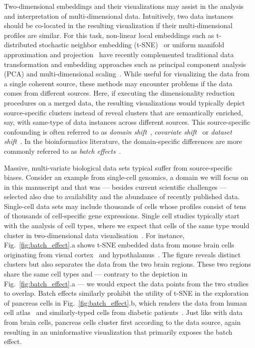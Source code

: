\documentclass[runningheads]{llncs}
\begin{document}
Two-dimensional embeddings and their visualizations may assist in the analysis
and interpretation of multi-dimensional data. Intuitively, two data instances
should be co-located in the resulting visualization if their multi-dimensional
profiles are similar. For this task, non-linear local embeddings such as
t-distributed stochastic neighbor embedding (t-SNE)~\cite{tsne} or uniform
manifold approximation and projection~\cite{umap} have recently complemented
traditional data transformation and embedding approaches such as principal
component analysis (PCA) and multi-dimensional
scaling~\cite{distill,umap_single_cell}. While useful for visualizing the data
from a single coherent source, these methods may encounter problems if the data
comes from different sources. Here, if executing the dimensionality reduction
procedures on a merged data, the resulting visualizations would typically
depict source-specific clusters instead of reveal clusters that are
semantically enriched, say, with same-type of data instances across different
sources. This source-specific confounding is often referred to as {\em domain
shift}~\cite{domain_shift}, {\em covariate shift}~\cite{covariate_shift} or
{\em dataset shift}~\cite{dataset_shift}. In the bioinformatics literature, the
domain-specific differences are more commonly referred to as {\em batch
effects}~\cite{cca,mnn,seurat}.

Massive, multi-variate biological data sets typical suffer from source-specific
biases. Consider an example from single-cell genomics, a domain we will focus
on in this manuscript and that was --- besides current scientific challenges
--- selected also due to availability and the abundance of recently published
data. Single-cell data sets may include thousands of cells whose profiles
consist of tens of thousands of cell-specific gene expressions. Single cell
studies typically start with the analysis of cell types, where we expect that
cells of the same type would cluster in two-dimensional data
visualisation~\cite{seurat}. For instance, Fig.~\ref{fig:batch_effect}.a shows
t-SNE embedded data from mouse brain cells originating from visual
cortex~\cite{hrvatin2018} and hypothalamus~\cite{chen2017}. The figure reveals
distinct clusters but also separates the data from the two brain regions. These
two regions share the same cell types and --- contrary to the depiction in
Fig.~\ref{fig:batch_effect}.a --- we would expect the data points from the two
studies to overlap. Batch effects similarly prohibit the utility of t-SNE in
the exploration of pancreas cells in Fig.~\ref{fig:batch_effect}.b, which
renders the data from human cell atlas~\cite{baron2016} and similarly-typed
cells from diabetic patients~\cite{xin2016}. Just like with data from brain
cells, pancreas cells cluster first according to the data source, again
resulting in an uninformative visualization that primarily exposes the batch
effect.
\end{document}
